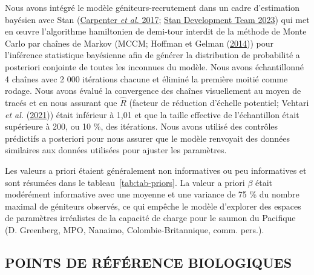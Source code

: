\documentclass[french,11pt]{book}
\begin{document}
Nous avons intégré le modèle géniteurs-recrutement dans un cadre d'estimation bayésien avec Stan (\protect\hyperlink{ref-carpenter_stan_2017}{Carpenter \emph{et al.} 2017}; \protect\hyperlink{ref-standevelopmentteamRstanInterfaceStan2023}{Stan Development Team 2023}) qui met en œuvre l'algorithme hamiltonien de demi-tour interdit de la méthode de Monte Carlo par chaînes de Markov (MCCM; Hoffman et Gelman (\protect\hyperlink{ref-hoffman2014}{2014})) pour l'inférence statistique bayésienne afin de générer la distribution de probabilité a posteriori conjointe de toutes les inconnues du modèle. Nous avons échantillonné 4 chaînes avec 2 000 itérations chacune et éliminé la première moitié comme rodage. Nous avons évalué la convergence des chaînes visuellement au moyen de tracés et en nous assurant que \(\hat{R}\) (facteur de réduction d'échelle potentiel; Vehtari \emph{et al.} (\protect\hyperlink{ref-vehtari2021rank}{2021})) était inférieur à 1,01 et que la taille effective de l'échantillon était supérieure à 200, ou 10 \%, des itérations. Nous avons utilisé des contrôles prédictifs a posteriori pour nous assurer que le modèle renvoyait des données similaires aux données utilisées pour ajuster les paramètres.

Les valeurs a priori étaient généralement non informatives ou peu informatives et sont résumées dans le tableau~\ref{tab:tab-priors}. La valeur a priori \(\beta\) était modérément informative avec une moyenne et une variance de 75 \% du nombre maximal de géniteurs observés, ce qui empêche le modèle d'explorer des espaces de paramètres irréalistes de la capacité de charge pour le saumon du Pacifique (D. Greenberg, MPO, Nanaimo, Colombie-Britannique, comm. pers.).

\hypertarget{points-de-ruxe9fuxe9rence-biologiques}{%
\subsection{POINTS DE RÉFÉRENCE BIOLOGIQUES}\label{points-de-ruxe9fuxe9rence-biologiques}}
\end{document}
